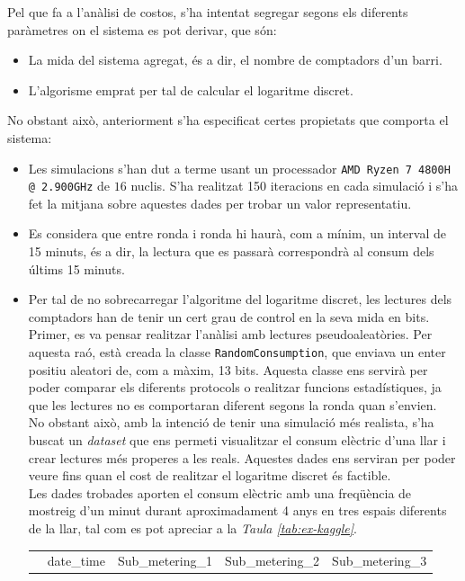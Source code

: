 
Pel que fa a l'anàlisi de costos, s'ha intentat segregar segons els diferents paràmetres on el sistema es pot derivar, que són:
\begin{itemize}
	\item La mida del sistema agregat, és a dir, el nombre de comptadors d'un barri.
	\item L'algorisme emprat per tal de calcular el logaritme discret.
\end{itemize}
No obstant això, anteriorment s'ha especificat certes propietats que comporta el sistema:
\label{sec:dataset}
\begin{itemize}
	\item Les simulacions s'han dut a terme usant un processador \texttt{AMD Ryzen 7 4800H @ 2.900GHz} de $16$ nuclis. S'ha realitzat 150 iteracions en cada simulació i s'ha fet la mitjana sobre aquestes dades per trobar un valor representatiu.
	\item Es considera que entre ronda i ronda hi haurà, com a mínim, un interval de 15 minuts, és a dir, la lectura que es passarà correspondrà al consum dels últims 15 minuts.
	\item Per tal de no sobrecarregar l'algoritme del logaritme discret, les lectures dels comptadors han de tenir un cert grau de control en la seva mida en bits.\\
	 Primer, es va pensar realitzar l'anàlisi amb lectures pseudoaleatòries. Per aquesta raó, està creada la classe \texttt{RandomConsumption}, que enviava un enter positiu aleatori de, com a màxim, 13 bits. Aquesta classe ens servirà per poder comparar els diferents protocols o realitzar funcions estadístiques, ja que les lectures no es comportaran diferent segons la ronda quan s'envien.\\
	 No obstant això, amb la intenció de tenir una simulació més realista, s'ha buscat un \textit{dataset} que ens permeti visualitzar el consum elèctric d'una llar \cite{kaggle-consumption} i crear lectures més properes a les reals. Aquestes dades ens serviran per poder veure fins quan el cost de realitzar el logaritme discret és factible.\\
	 Les dades trobades aporten el consum elèctric amb una freqüència de mostreig d'un minut durant aproximadament 4 anys en tres espais diferents de la llar, tal com es pot apreciar a la \textit{Taula \ref{tab:ex-kaggle}}.
	\begin{table}[H]
		\centering
			\begin{tabular}{llrrr}
				\toprule
				{} &           date\_time &  Sub\_metering\_1 &  Sub\_metering\_2 &  Sub\_metering\_3 \\

\end{tabular}
\end{table}
\end{itemize}
